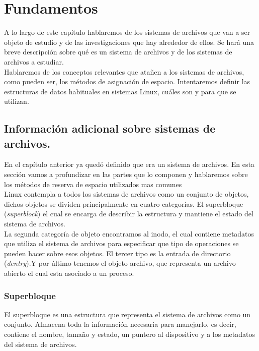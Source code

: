 \cleardoublepage
\clearpage{}

\chapter[Fundamentos]{Fundamentos}
A lo largo de este capítulo hablaremos de los sistemas de archivos que van a ser objeto de estudio y de las investigaciones que hay alrededor de ellos. Se hará una breve descripción sobre qué es un sistema de archivos y de los sistemas de archivos a estudiar.\\

Hablaremos de los conceptos relevantes que atañen a los sistemas de archivos, como pueden ser, los métodos de asignación de espacio. Intentaremos definir las estructuras de datos habituales en sistemas Linux, cuáles son y para que se utilizan. 


\section{Información adicional sobre sistemas de archivos.}
En el capítulo anterior ya quedó definido que era un sistema de archivos. En esta sección vamos a profundizar en las partes que lo componen y hablaremos sobre los métodos de reserva de espacio utilizados mas comunes\\

Linux contempla a todos los sistemas de archivos como un conjunto de objetos, dichos objetos se dividen principalmente en cuatro categorías. El superbloque (\textit{superblock}) el cual se encarga de describir la estructura y mantiene el estado del sistema de archivos.\\

La segunda categoría de objeto encontramos al inodo, el cual contiene metadatos que utiliza el sistema de archivos para especificar que tipo de operaciones se pueden hacer sobre esos objetos. El tercer tipo es la entrada de directorio (\textit{dentry}).Y por último tenemos el objeto archivo, que representa un archivo abierto el cual esta asociado a un proceso. \cite{jones_2007}

\subsection{Superbloque}
El superbloque es una estructura que representa el sistema de archivos como un conjunto. Almacena toda la información necesaria para manejarlo, es decir, contiene el nombre, tamaño y estado, un puntero al dispositivo y a los metadatos del sistema de archivos.

